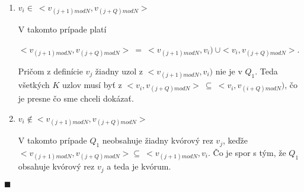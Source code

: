 \begin{enumerate}
  \item $v_i\in\: <v_{(j+1) mod N}, v_{(j+Q) mod N}>$

        V takomto prípade platí

        $<v_{(j+1) mod N}, v_{(j+Q) mod N}>\:=\: <v_{(j+1) mod N}, v_i)\: \cup <v_i, v_{(j+Q) mod N}>$.

        Pričom z definície $v_j$ žiadny uzol z $<v_{(j+1) mod N}, v_i)$ nie je v $Q_1$.
        Teda všetkých $K$ uzlov musí byť z $<v_i, v_{(j+Q) mod N}>\: \subseteq\: <v_i, v_{(i+Q) mod N})$,
        čo je presne čo sme chceli dokázať.
  \item $v_i\notin <v_{(j+1) mod N}, v_{(j+Q) mod N}>$

        V takomto prípade $Q_1$ neobsahuje žiadny kvórový rez $v_j$, keďže\\
        $<v_{(j+1) mod N}, v_{(j+Q) mod N}> \subseteq\: <v_{(j+1) mod N}, v_i$.
        Čo je spor s tým, že $Q_1$ obsahuje kvórový rez $v_j$ a teda je kvórum.
\end{enumerate} $\blacksquare$
